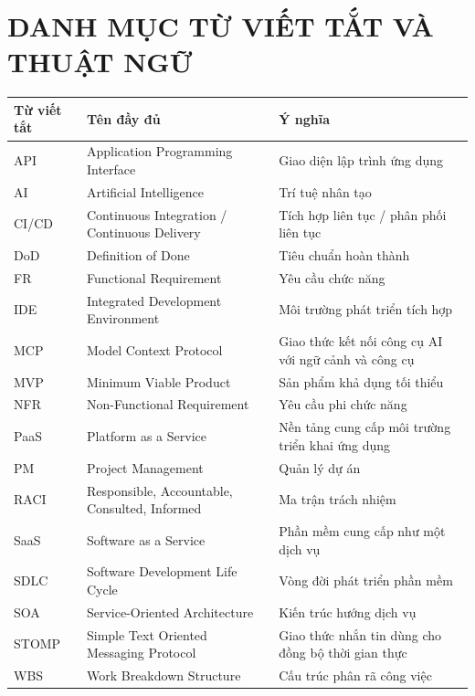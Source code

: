 \documentclass[12pt,a4paper]{report}
\makeatletter
\newcommand{\customlistoffigures}{%
    \section*{\listfigurename}%
    \@starttoc{lof}%
}
\newcommand{\customlistoftables}{%
    \section*{\listtablename}%
    \@starttoc{lot}%
}
\makeatother
\begin{document}
\chapter*{DANH MỤC TỪ VIẾT TẮT VÀ THUẬT NGỮ}
\begin{table}[H]
\centering
\begin{tabularx}{\textwidth}{|l|l|X|}
\hline
\textbf{Từ viết tắt} & \textbf{Tên đầy đủ} & \textbf{Ý nghĩa} \\
\hline
API & Application Programming Interface & Giao diện lập trình ứng dụng \\
AI & Artificial Intelligence & Trí tuệ nhân tạo \\
CI/CD & Continuous Integration / Continuous Delivery & Tích hợp liên tục / phân phối liên tục \\
DoD & Definition of Done & Tiêu chuẩn hoàn thành \\
FR & Functional Requirement & Yêu cầu chức năng \\
IDE & Integrated Development Environment & Môi trường phát triển tích hợp \\
MCP & Model Context Protocol & Giao thức kết nối công cụ AI với ngữ cảnh và công cụ \\
MVP & Minimum Viable Product & Sản phẩm khả dụng tối thiểu \\
NFR & Non-Functional Requirement & Yêu cầu phi chức năng \\
PaaS & Platform as a Service & Nền tảng cung cấp môi trường triển khai ứng dụng \\
PM & Project Management & Quản lý dự án \\
RACI & Responsible, Accountable, Consulted, Informed & Ma trận trách nhiệm \\
SaaS & Software as a Service & Phần mềm cung cấp như một dịch vụ \\
SDLC & Software Development Life Cycle & Vòng đời phát triển phần mềm \\
SOA & Service-Oriented Architecture & Kiến trúc hướng dịch vụ \\
STOMP & Simple Text Oriented Messaging Protocol & Giao thức nhắn tin dùng cho đồng bộ thời gian thực \\
WBS & Work Breakdown Structure & Cấu trúc phân rã công việc \\
\hline
\end{tabularx}
\end{table}

\customlistoftables
{}
\clearpage
\customlistoffigures
{}
\clearpage
\end{document}
